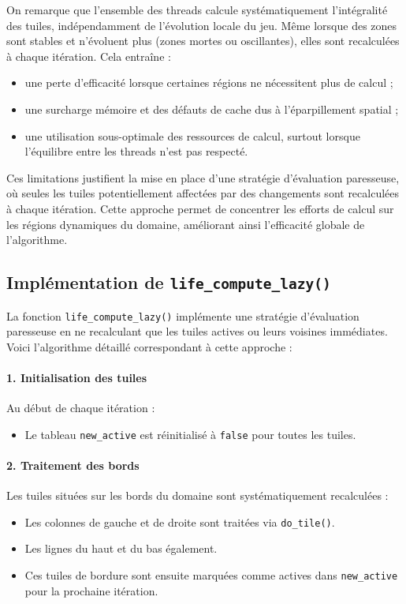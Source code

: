 \documentclass[a4paper,12pt]{article}
\begin{document}
On remarque que l’ensemble des threads calcule systématiquement l’intégralité des tuiles, indépendamment de l’évolution locale du jeu. Même lorsque des zones sont stables et n’évoluent plus (zones mortes ou oscillantes), elles sont recalculées à chaque itération. Cela entraîne :
\begin{itemize}
    \item une perte d’efficacité lorsque certaines régions ne nécessitent plus de calcul ;
    \item une surcharge mémoire et des défauts de cache dus à l’éparpillement spatial ;
    \item une utilisation sous-optimale des ressources de calcul, surtout lorsque l’équilibre entre les threads n’est pas respecté.
\end{itemize}

Ces limitations justifient la mise en place d’une stratégie d’évaluation paresseuse, où seules les tuiles potentiellement affectées par des changements sont recalculées à chaque itération. Cette approche permet de concentrer les efforts de calcul sur les régions dynamiques du domaine, améliorant ainsi l’efficacité globale de l’algorithme.


\subsection{Implémentation de \texttt{life\_compute\_lazy()}}

La fonction \texttt{life\_compute\_lazy()} implémente une stratégie d’évaluation paresseuse en ne recalculant que les tuiles actives ou leurs voisines immédiates. Voici l’algorithme détaillé correspondant à cette approche :

\paragraph{1. Initialisation des tuiles}

Au début de chaque itération :
\begin{itemize}
  \item Le tableau \texttt{new\_active} est réinitialisé à \texttt{false} pour toutes les tuiles.
\end{itemize}

\paragraph{2. Traitement des bords}

Les tuiles situées sur les bords du domaine sont systématiquement recalculées :
\begin{itemize}
  \item Les colonnes de gauche et de droite sont traitées via \texttt{do\_tile()}.
  \item Les lignes du haut et du bas également.
  \item Ces tuiles de bordure sont ensuite marquées comme actives dans \texttt{new\_active} pour la prochaine itération.
\end{itemize}
\end{document}
